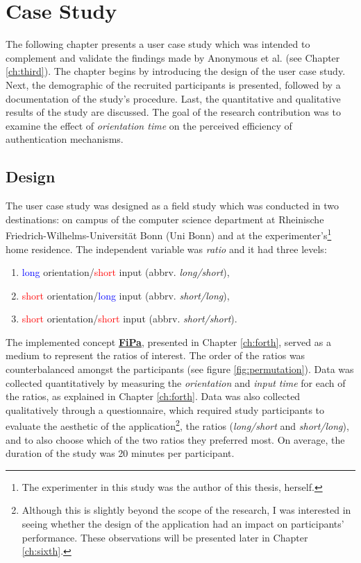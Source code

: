 
\chapter{Case Study}\label{ch:fifth}

The following chapter presents a user case study which was intended to complement and validate the findings made by Anonymous et al. \cite{anonymous} (see Chapter \ref{ch:third}). The chapter begins by introducing the design of the user case study. Next, the demographic of the recruited participants is presented, followed by a documentation of the study's procedure. Last, the quantitative and qualitative results of the study are discussed. The goal of the research contribution was to examine the effect of \textit{orientation time} on the perceived efficiency of authentication mechanisms. 

\section{Design} \label{5.1}

The user case study was designed as a field study which was conducted in two destinations: on campus of the computer science department at Rheinische Friedrich-Wilhelms-Universit{\"a}t Bonn (Uni Bonn) and at the experimenter's\footnote{The experimenter in this study was the author of this thesis, herself.} home residence. The independent variable was \textit{ratio} and it had three levels:
\begin{enumerate}
    \item \textcolor{blue}{long} orientation/\textcolor{red}{short} input (abbrv. \textit{long/short}), 
    \item \textcolor{red}{short} orientation/\textcolor{blue}{long} input (abbrv. \textit{short/long}), 
    \item \textcolor{red}{short} orientation/\textcolor{red}{short} input (abbrv. \textit{short/short}). 
\end{enumerate}

The implemented concept \underline{\textbf{FiPa}}, presented in Chapter \ref{ch:forth}, served as a medium to represent the ratios of interest. The order of the ratios was counterbalanced amongst the participants (see figure \ref{fig:permutation}). Data was collected quantitatively by measuring the \textit{orientation} and \textit{input time} for each of the ratios, as explained in Chapter \ref{ch:forth}. Data was also collected qualitatively through a questionnaire, which required study participants to evaluate the aesthetic of the application\footnote{Although this is slightly beyond the scope of the research, I was interested in seeing whether the design of the application had an impact on participants' performance. These observations will be presented later in Chapter \ref{ch:sixth}.}, the ratios (\textit{long/short} and \textit{short/long}), and to also choose which of the two ratios they preferred most. On average, the duration of the study was 20 minutes per participant. 

